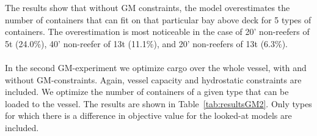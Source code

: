 The results show that without GM constraints, the model overestimates the number of containers that can fit on that particular bay above deck for 5 types of containers. The overestimation is most noticeable in the case of 20' non-reefers of 5t (24.0\%), 40' non-reefer of 13t (11.1\%), and 20' non-reefers of 13t (6.3\%).
\\\\
In the second GM-experiment we optimize cargo over the whole vessel, with and without GM-constraints. %
Again, vessel capacity and hydrostatic constraints are included. We optimize the number of containers of a given type that can be loaded to the vessel.
The results are shown in Table~\ref{tab:resultsGM2}. Only types for which there is a difference in objective value for the looked-at models are included.
